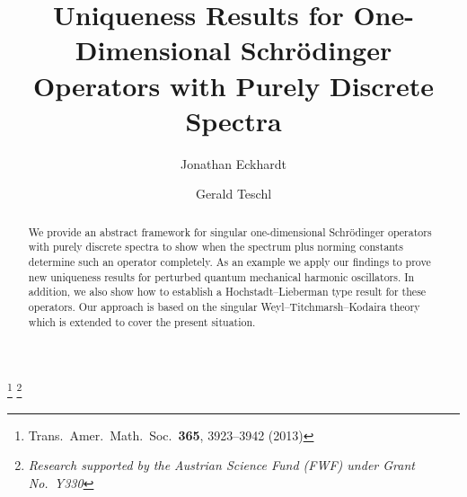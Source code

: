 \documentclass{amsart}
\numberwithin{equation}{section}
\begin{document}
\title[Uniqueness Results for Schr\"odinger Operators]{Uniqueness Results for One-Dimensional Schr\"odinger Operators with Purely Discrete Spectra}

\author[J.\ Eckhardt]{Jonathan Eckhardt}
\address{Faculty of Mathematics\\ University of Vienna\\
Nordbergstrasse 15\\ 1090 Wien\\ Austria}

\author[G.\ Teschl]{Gerald Teschl}
\address{Faculty of Mathematics\\ University of Vienna\\
Nordbergstrasse 15\\ 1090 Wien\\ Austria\\ and International
Erwin Schr\"odinger
Institute for Mathematical Physics\\ Boltzmanngasse 9\\ 1090 Wien\\ Austria}

\thanks{Trans.\ Amer.\ Math.\ Soc.\ {\bf 365}, 3923--3942 (2013)}
\thanks{{\it Research supported by the Austrian Science Fund (FWF) under Grant No.\ Y330}}


\begin{abstract}
We provide an abstract framework for singular one-dimensional Schr\"odinger operators  with purely discrete spectra
to show when the spectrum plus norming constants determine such an operator completely. As an example we apply
our findings to prove new uniqueness results for perturbed quantum mechanical harmonic oscillators. In addition, we
also show how to establish a Hochstadt--Lieberman type result for these operators. Our approach is based on
the singular Weyl--Titchmarsh--Kodaira theory which is extended to cover the present situation.
\end{abstract}

\maketitle
\end{document}

